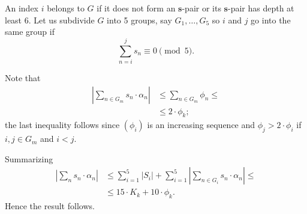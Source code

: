 \documentclass[a4paper,10pt]{amsart}
\begin{document}
An index $i$ belongs to $G$ 
if it does not form an $\bm{s}$-pair 
or its $\bm{s}$-pair has depth at least $6$.
Let us subdivide $G$ into 5 groups, say $G_1,\dots,G_5$ 
so $i$ and $j$ go into the same group if 
\[\sum_{n=i}^j s_n\equiv 0\pmod 5.\]

Note that
\begin{align*}
|\sum_{n\in G_m}s_n\cdot \alpha_n|
&\le \sum_{n\in G_m}\phi_n\le
\\
&\le 2\cdot\phi_k;
\end{align*}
the last inequality follows since $(\phi_i)$ is an increasing sequence 
and
$\phi_j>2\cdot \phi_i$
if $i,j\in G_m$ and $i<j$.

Summarizing
\begin{align*}
|\sum_n s_n\cdot\alpha_n|&\le 
\sum_{i=1}^5|S_i|
+
\sum_{i=1}^5\left|\sum_{n\in G_i} s_n\cdot\alpha_n\right|\le
\\
&\le 15\cdot K_k+10\cdot \phi_k.
\end{align*}
Hence the result follows.
\qeds


\sloppy
\printbibliography[heading=bibintoc]
\fussy
\end{document}
